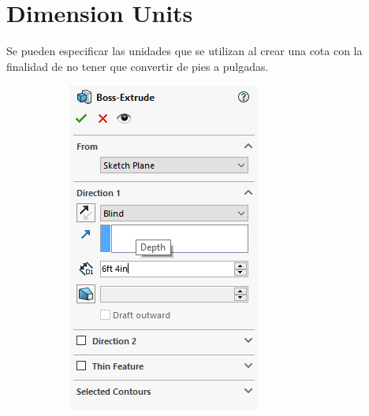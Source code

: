 \documentclass[12pt,letterpaper,final]{report}
\begin{document}
\chapter{Dimension Units}

Se pueden especificar las unidades que se utilizan al crear una cota con la finalidad de no tener que convertir de pies a pulgadas.

\begin{figure}[H]
	\centering
	\begin{subfigure}[b]{0.35\textwidth}
		\includegraphics[width=\textwidth]{Imagenes/solidworks_feetin01}

\end{subfigure}
\end{figure}
\end{document}

